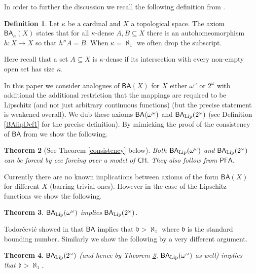 \documentclass[leqno,11pt]{amsart}
\newtheorem{theorem}{Theorem}[section]
\theoremstyle{definition}
\newtheorem{definition}[theorem]{Definition}
\theoremstyle{remark}
\def\PFA{\mathsf{PFA}}
\def\BA{\mathsf{BA}}
\def\baire{\omega^\omega}
\def\cantor{2^\omega}
\def\mfb{\mathfrak b}
\def\CH {\mathsf{CH}}
\def\cc{2^{\aleph_0}}
\begin{document}

In order to further the discussion we recall the following definition from \cite{Stepranswatson87}.
\begin{definition} \label{topBAdef}
    Let $\kappa$ be a cardinal and $X$ a topological space. The axiom $\BA_\kappa (X)$ states that for all $\kappa$-dense $A, B \subseteq X$ there is an autohomeomorphism $h:X \to X$ so that $h''A = B$. When $\kappa = \aleph_1$ we often drop the subscript. 
\end{definition}
Here recall that a set $A \subseteq  X$ is $\kappa$-dense if its intersection with every non-empty open set has size $\kappa$.


In this paper we consider analogues of $\BA (X)$ for $X$ either $\baire$ or $\cantor$ with additional the additional restriction that the mappings are required to be Lipschitz (and not just arbitrary continuous functions) (but the precise statement is weakened overall). We dub these axioms $\BA_{\rm} (\baire)$ and $\BA_{\rm Lip}(\cantor)$ (see Definition \ref{BAlipDef1} for the precise definition). By mimicking the proof of the consistency of $\BA$ from \cite{Baum73} we show the following. 

\begin{theorem}[See Theorem \ref{consistency} below] \label{consistencyintro}
    Both $\BA_{\rm Lip} (\baire)$ and $\BA_{\rm Lip} (2^\omega)$ can be forced by ccc forcing over a model of $\CH$. They also follow from $\PFA$. 
\end{theorem}
Currently there are no known implications between axioms of the form $\BA (X)$ for different $X$ (barring trivial ones). However in the case of the Lipschitz functions we show the following.
\begin{theorem}
    $\BA_{\rm Lip} (\baire)$ implies $\BA_{\rm Lip} (\cantor)$. \label{implicationintro}
\end{theorem}
Todor\v{c}evi\'c showed in \cite{Todorcevic89} that $\BA$ implies that $\mfb > \aleph_1$ where $\mfb$ is the standard bounding number. Similarly we show the following by a very different argument.
\begin{theorem}
  $\BA_{\rm Lip} (2^\omega)$ (and hence by Theorem \ref{implicationintro}, $\BA_{\rm Lip} (\baire)$ as well) implies that $\mfb > \aleph_1$. \label{bintro}
\end{theorem}
\end{document}
